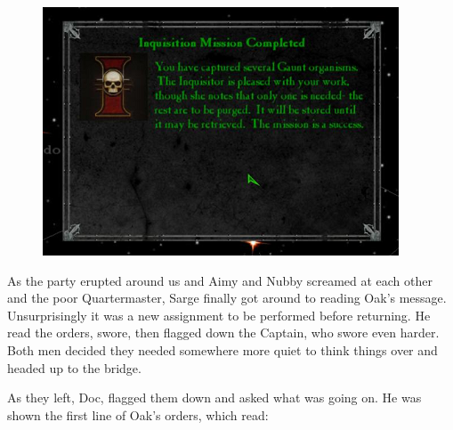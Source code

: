 \begin{figure}
	\begin{center}
		\includegraphics[width=\figwidth]{pics/11/105.png}
	\end{center}
\end{figure}
As the party erupted around us and Aimy and Nubby screamed at each other and the poor Quartermaster, Sarge finally got around to reading Oak's message. 
Unsurprisingly it was a new assignment to be performed before returning. 
He read the orders, swore, then flagged down the Captain, who swore even harder. 
Both men decided they needed somewhere more quiet to think things over and headed up to the bridge.

As they left, Doc, flagged them down and asked what was going on. 
He was shown the first line of Oak's orders, which read:


